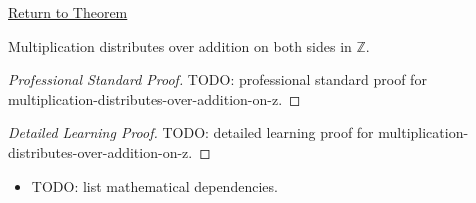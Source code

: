 \newpage
{}
\label{prf:multiplication-distributes-over-addition-on-z}

\begin{remark*}[Return]
\hyperref[thm:multiplication-distributes-over-addition-on-z]{Return to Theorem}
\end{remark*}

\begin{theorem*}
Multiplication distributes over addition on both sides in $\mathbb{Z}$.
\end{theorem*}

\begin{proof}[Professional Standard Proof]
\LRAProofBodyStart
TODO: professional standard proof for multiplication-distributes-over-addition-on-z.
\end{proof}

\begin{proof}[Detailed Learning Proof]
\LRAProofBodyStart
TODO: detailed learning proof for multiplication-distributes-over-addition-on-z.
\end{proof}

\begin{remark*}
\end{remark*}

\begin{dependencies}
\begin{itemize}
  \item TODO: list mathematical dependencies.
\end{itemize}
\end{dependencies}

\clearpage
